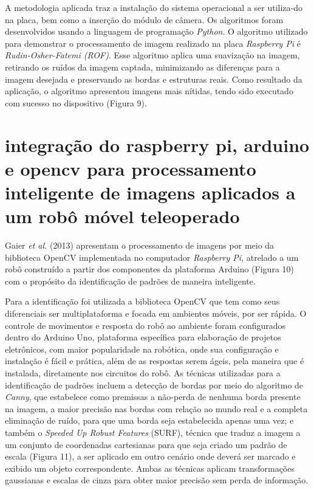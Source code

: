 \documentclass[12pt,oneside,a4paper,chapter=TITLE,section=TITLE,sumario=tradicional]{abntex2}
\begin{document}
\newline A metodologia aplicada traz a instalação do sistema operacional a ser utiliza-do na placa, bem como a inserção do módulo de câmera. Os algoritmos foram desenvolvidos usando a linguagem de programação \textit{Python}. O algoritmo utilizado para demonstrar o processamento de imagem realizado na placa \textit{Raspberry Pi} é \textit{Rudin-Osher-Fatemi (ROF)}. Esse algoritmo aplica uma suavização na imagem, retirando os ruídos da imagem captada, minimizando as diferenças para a imagem desejada e preservando as bordas e estruturas reais. Como resultado da aplicação, o algoritmo apresentou imagens mais nítidas, tendo sido executado com sucesso no dispositivo (Figura 9).

\begin{figure}[htb]
\end{figure}


\section{integração do raspberry pi, arduino e opencv para processamento inteligente de imagens aplicados a um robô móvel teleoperado}
Gaier \textit{et al.} (2013) apresentam o processamento de imagens por meio da biblioteca OpenCV implementada no computador \textit{Raspberry Pi}, atrelado a um robô construído a partir dos componentes da plataforma Arduino (Figura 10) com o propósito da identificação de padrões de maneira inteligente.

\begin{figure}[htb]
\end{figure}

Para a identificação foi utilizada a biblioteca OpenCV que tem como seus diferenciais ser multiplataforma e focada em ambientes móveis, por ser rápida. O controle de movimentos e resposta do robô ao ambiente foram configurados dentro do Arduino Uno, plataforma específica para elaboração de projetos eletrônicos, com maior popularidade na robótica, onde sua configuração e instalação é fácil e prática, além de as respostas serem ágeis, pela maneira que é instalada, diretamente nos circuitos do robô.
As técnicas utilizadas para a identificação de padrões incluem a detecção de bordas por meio do algoritmo de \textit{Canny}, que estabelece como premissas a não-perda de nenhuma borda presente na imagem, a maior precisão nas bordas com relação ao mundo real e a completa eliminação de ruído, para que uma borda seja estabelecida apenas uma vez; e também o \textit{Speeded Up Robust Features} (SURF), técnica que traduz a imagem a um conjunto de coordenadas cartesianas para que seja criado um padrão de escala (Figura 11), a ser aplicado em outro cenário onde deverá ser marcado e exibido um objeto correspondente. Ambas as técnicas aplicam transformações gaussianas e escalas de cinza para obter maior precisão sem perda de informação.
\end{document}
